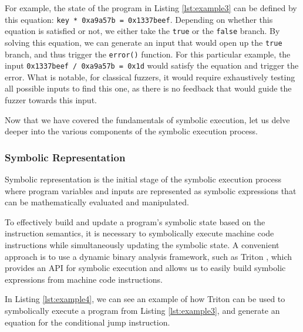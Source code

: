 For example, the state of the program in Listing \ref{lst:example3} can be defined by this equation: \texttt{key * 0xa9a57b = 0x1337beef}. Depending on whether this equation is satisfied or not, we either take the \texttt{true} or the \texttt{false} branch. By solving this equation, we can generate an input that would open up the \texttt{true} branch, and thus trigger the \texttt{error()} function. For this particular example, the input \texttt{0x1337beef / 0xa9a57b = 0x1d} would satisfy the equation and trigger the error. What is notable, for classical fuzzers, it would require exhaustively testing all possible inputs to find this one, as there is no feedback that would guide the fuzzer towards this input.

Now that we have covered the fundamentals of symbolic execution, let us delve deeper into the various components of the symbolic execution process.

\subsubsection{Symbolic Representation}

Symbolic representation is the initial stage of the symbolic execution process where program variables and inputs are represented as symbolic expressions that can be mathematically evaluated and manipulated.

To effectively build and update a program's symbolic state based on the instruction semantics, it is necessary to symbolically execute machine code instructions while simultaneously updating the symbolic state. A convenient approach is to use a dynamic binary analysis framework, such as Triton \cite{triton-sstic2015}, which provides an API for symbolic execution and allows us to easily build symbolic expressions from machine code instructions.

In Listing \ref{lst:example4}, we can see an example of how Triton can be used to symbolically execute a program from Listing \ref{lst:example3}, and generate an equation for the conditional jump instruction.



